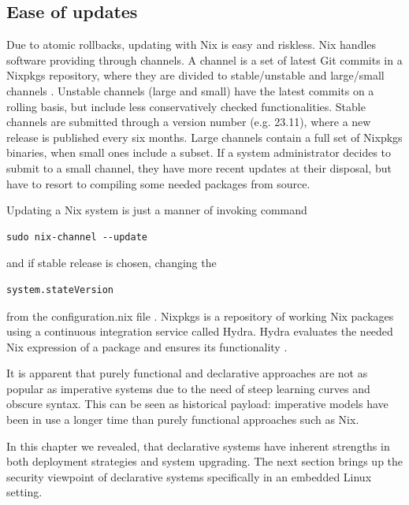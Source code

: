 \subsection{Ease of updates}

Due to atomic rollbacks, updating with Nix is easy and riskless. Nix
handles software providing through channels. A channel is a set of
latest Git commits in a Nixpkgs repository, where they are divided to
stable/unstable and large/small channels
\cite{nixosChannelsNixOS}. Unstable channels (large and small) have
the latest commits on a rolling basis, but include less conservatively
checked functionalities. Stable channels are submitted through a
version number (e.g. 23.11), where a new release is published every
six months. Large channels contain a full set of Nixpkgs binaries,
when small ones include a subset. If a system administrator decides to
submit to a small channel, they have more recent updates at their
disposal, but have to resort to compiling some needed packages from
source.

Updating a Nix system is just a manner of invoking command

\begin{lstlisting}
sudo nix-channel --update
\end{lstlisting}
and if stable release is chosen, changing the
\begin{lstlisting}
system.stateVersion
\end{lstlisting}
from the configuration.nix file \cite{nixosNixOSManual}. Nixpkgs is a
repository of working Nix packages using a continuous integration
service called Hydra. Hydra evaluates the needed Nix expression of a
package and ensures its functionality \cite{nixosNixOSManual}.

It is apparent that purely functional and declarative approaches are not as popular
as imperative systems due to the need of steep learning curves and
obscure syntax. This can be seen as historical payload: imperative
models have been in use a longer time than purely functional
approaches such as Nix.

In this chapter we revealed, that declarative systems have inherent
strengths in both deployment strategies and system upgrading. The next
section brings up the security viewpoint of declarative systems
specifically in an embedded Linux setting.
